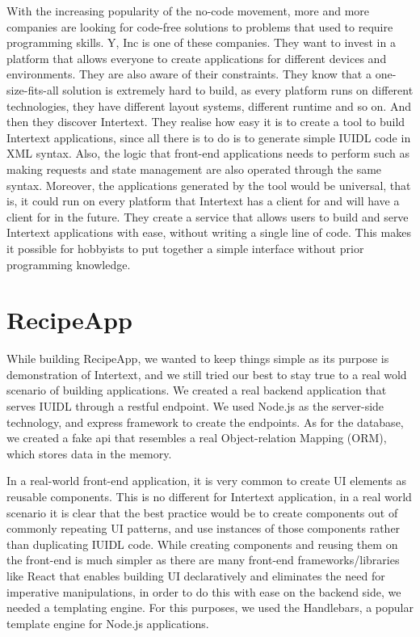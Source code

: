 With the increasing popularity of the no-code movement, more and more companies are looking for code-free solutions to problems that used to require programming skills. Y, Inc is one of these companies. They want to invest in a platform that allows everyone to create applications for different devices and environments. They are also aware of their constraints. They know that a one-size-fits-all solution is extremely hard to build, as every platform runs on different technologies, they have different layout systems, different runtime and so on. And then they discover Intertext. They realise how easy it is to create a tool to build Intertext applications, since all there is to do is to generate simple IUIDL code in XML syntax. Also, the logic that front-end applications needs to perform such as making requests and state management are also operated through the same syntax. Moreover, the applications generated by the tool would be universal, that is, it could run on every platform that Intertext has a client for and will have a client for in the future. They create a service that allows users to build and serve Intertext applications with ease, without writing a single line of code. This makes it possible for hobbyists to put together a simple interface without prior programming knowledge.

 
\section{RecipeApp}

While building RecipeApp, we wanted to keep things simple as its purpose is demonstration of Intertext, and we still tried our best to stay true to a real wold scenario of building applications. We created a real backend application that serves IUIDL through a restful endpoint. We used Node.js as the server-side technology, and express framework to create the endpoints. As for the database, we created a fake api that resembles a real Object-relation Mapping (ORM), which stores data in the memory.

In a real-world front-end application, it is very common to create UI elements as reusable components. This is no different for Intertext application, in a real world scenario it is clear that the best practice would be to create components out of commonly repeating UI patterns, and use instances of those components rather than duplicating IUIDL code. While creating components and reusing them on the front-end is much simpler as there are many front-end frameworks/libraries like React that enables building UI declaratively and eliminates the need for imperative manipulations, in order to do this with ease on the backend side, we needed a templating engine. For this purposes, we used the Handlebars, a popular template engine for Node.js applications.


